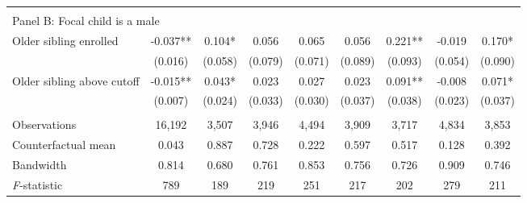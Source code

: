{{\begin{tabular}{lcccccccc}
&  &  &  & & & & & \\
\multicolumn{10}{l}{Panel B: Focal child is a male} \\
Older sibling enrolled&      -0.037** &       0.104*  &       0.056   &       0.065   &       0.056   &       0.221** &      -0.019   &       0.170*  \\
                    &     (0.016)   &     (0.058)   &     (0.079)   &     (0.071)   &     (0.089)   &     (0.093)   &     (0.054)   &     (0.090)   \\
 
Older sibling above cutoff&      -0.015** &       0.043*  &       0.023   &       0.027   &       0.023   &       0.091** &      -0.008   &       0.071*  \\
                    &     (0.007)   &     (0.024)   &     (0.033)   &     (0.030)   &     (0.037)   &     (0.038)   &     (0.023)   &     (0.037)   \\
                    &               &               &               &               &               &               &               &               \\
Observations        &      16,192   &       3,507   &       3,946   &       4,494   &       3,909   &       3,717   &       4,834   &       3,853   \\
Counterfactual mean &       0.043   &       0.887   &       0.728   &       0.222   &       0.597   &       0.517   &       0.128   &       0.392   \\
Bandwidth           &       0.814   &       0.680   &       0.761   &       0.853   &       0.756   &       0.726   &       0.909   &       0.746   \\
\textit{F}-statistic&         789   &         189   &         219   &         251   &         217   &         202   &         279   &         211   \\
 

\bottomrule
\end{tabular}
}
}
